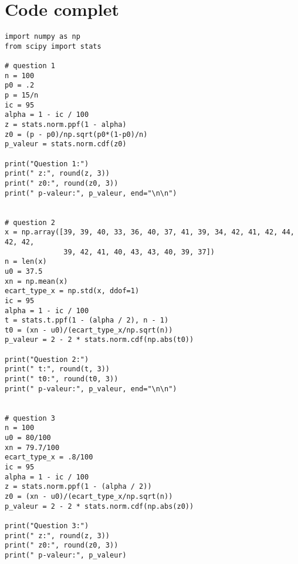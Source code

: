 \vspace{1cm}
\section{Code complet}
\begin{lstlisting}[style=myPython, caption=Code Python complet TP4, frame=lines]
import numpy as np
from scipy import stats

# question 1
n = 100
p0 = .2
p = 15/n
ic = 95
alpha = 1 - ic / 100
z = stats.norm.ppf(1 - alpha)
z0 = (p - p0)/np.sqrt(p0*(1-p0)/n)
p_valeur = stats.norm.cdf(z0)

print("Question 1:")
print(" z:", round(z, 3))
print(" z0:", round(z0, 3))
print(" p-valeur:", p_valeur, end="\n\n")


# question 2
x = np.array([39, 39, 40, 33, 36, 40, 37, 41, 39, 34, 42, 41, 42, 44, 42, 42, 
              39, 42, 41, 40, 43, 43, 40, 39, 37])
n = len(x)
u0 = 37.5
xn = np.mean(x)
ecart_type_x = np.std(x, ddof=1)
ic = 95
alpha = 1 - ic / 100
t = stats.t.ppf(1 - (alpha / 2), n - 1)
t0 = (xn - u0)/(ecart_type_x/np.sqrt(n))
p_valeur = 2 - 2 * stats.norm.cdf(np.abs(t0))

print("Question 2:")
print(" t:", round(t, 3))
print(" t0:", round(t0, 3))
print(" p-valeur:", p_valeur, end="\n\n")


# question 3
n = 100
u0 = 80/100
xn = 79.7/100
ecart_type_x = .8/100
ic = 95
alpha = 1 - ic / 100
z = stats.norm.ppf(1 - (alpha / 2))
z0 = (xn - u0)/(ecart_type_x/np.sqrt(n))
p_valeur = 2 - 2 * stats.norm.cdf(np.abs(z0))

print("Question 3:")
print(" z:", round(z, 3))
print(" z0:", round(z0, 3))
print(" p-valeur:", p_valeur)
\end{lstlisting}
